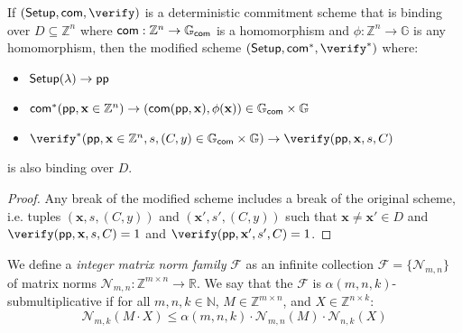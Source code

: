 \begin{lemma}[trivial]
If $(\setup, \com, \verify)$ is a deterministic commitment scheme that is binding over $D \subseteq \mathbb{Z}^n$ where $\mathsf{com}: \mathbb{Z}^n \rightarrow \mathbb{G}_\textsf{com}$ is a homomorphism and $\phi: \mathbb{Z}^n \rightarrow \mathbb{G}$ is any homomorphism, then the modified scheme $(\setup, \com^*, \verify^*)$ where: 
\begin{itemize}
\item $\textsf{{Setup}}(\lambda) \rightarrow \textsf{pp}$
\item $\mathsf{com}^*(\textsf{pp}, \mathbf{x} \in \mathbb{Z}^n) \rightarrow (\mathsf{com}(\textsf{pp}, \mathbf{x}), \phi(\mathbf{x})) \in \mathbb{G}_\textsf{com} \times \mathbb{G}$
\item $\verify^*(\params, \mathbf{x} \in \mathbb{Z}^n, s, (C, y) \in \mathbb{G}_\textsf{com} \times \mathbb{G}) \rightarrow \verify(\params, \mathbf{x}, s, C)$
\end{itemize}
is also binding over $D$. 
\end{lemma}
\begin{proof}
Any break of the modified scheme includes a break of the original scheme, i.e. tuples $(\mathbf{x}, s, (C, y))$ and $(\mathbf{x}', s', (C, y))$ such that $\mathbf{x} \neq \mathbf{x}' \in D$ and $\verify(\params, \mathbf{x}, s, C) = 1 $ and $\verify(\params, \mathbf{x}', s', C) = 1$. 
\end{proof}

\begin{definition}
We define a \emph{integer matrix norm family} $\mathcal{F}$ as an infinite collection $\mathcal{F} = \{\mathcal{N}_{m, n} \}$ of matrix norms $\mathcal{N}_{m,n}: \mathbb{Z}^{m \times n} \rightarrow \mathbb{R}$. We say that the $\mathcal{F}$ is $\alpha(m,n,k)$-submultiplicative if for all $m, n, k \in \mathbb{N}$, $M \in \mathbb{Z}^{m \times n}$, and $X \in \mathbb{Z}^{n \times k}$: 
$$\mathcal{N}_{m, k}(M \cdot X) \leq \alpha(m,n,k) \cdot \mathcal{N}_{m,n}(M) \cdot \mathcal{N}_{n,k}(X)  $$ 
\end{definition}

